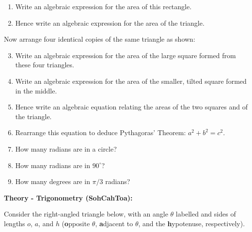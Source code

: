 \documentclass{article}
\begin{document}
\begin{enumerate}
\item Write an algebraic expression for the area of this rectangle.
\item Hence write an algebraic expression for the area of the triangle.
\end{enumerate}

Now arrange four identical copies of the same triangle as shown:

\begin{center}
\end{center}

\begin{enumerate}
\setcounter{enumi}{2}
\item Write an algebraic expression for the area of the large square formed from these four triangles.
\item Write an algebraic expression for the area of the smaller, tilted square formed in the middle.
\item Hence write an algebraic equation relating the areas of the two squares and of the triangle.
\item Rearrange this equation to deduce Pythagoras' Theorem: $a^2+b^2=c^2$.
\item How many radians are in a circle?
\item How many radians are in $90^\circ$?
\item How many degrees are in $\pi/3$ radians?
\end{enumerate}

\clearpage


{\bf Theory - Trigonometry (SohCahToa):}

Consider the right-angled triangle below, with an angle $\theta$ labelled and sides of lengths $o$, $a$, and $h$ ({\bf o}pposite $\theta$, {\bf a}djacent to $\theta$, and the {\bf h}ypotenuse, respectively).

\begin{center}
\end{center}
\end{document}
